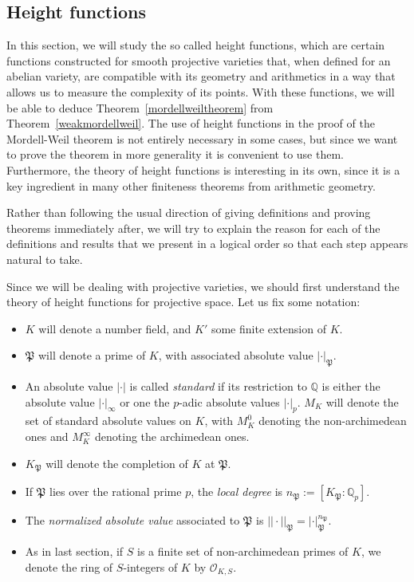 \documentclass[a4paper, 12pt]{amsart}
\theoremstyle{definition}
\theoremstyle{plain}
\theoremstyle{plain}
\theoremstyle{plain}
\theoremstyle{plain}
\theoremstyle{remark}
\theoremstyle{remark}
\theoremstyle{plain}
\newcommand{\thmref}[1]{Theorem~\ref{#1}}
\newcommand{\Q}{\mathbb{Q}}
\renewcommand{\P}{\mathfrak{P}}
\begin{document}
	\subsection{Height functions}
	
	In this section, we will study the so called height functions, which are certain functions constructed for smooth projective varieties that, when defined for an abelian variety, are compatible with its geometry and arithmetics in a way that allows us to measure the complexity of its points. With these functions, we will be able to deduce \thmref{mordellweiltheorem} from \thmref{weakmordellweil}. The use of height functions in the proof of the Mordell-Weil theorem is not entirely necessary in some cases, but since we want to prove the theorem in more generality it is convenient to use them. Furthermore, the theory of height functions is interesting in its own, since it is a key ingredient in many other finiteness theorems from arithmetic geometry.
	
	Rather than following the usual direction of giving definitions and proving theorems immediately after, we will try to explain the reason for each of the definitions and results that we present in a logical order so that each step appears natural to take.
	
	Since we will be dealing with projective varieties, we should first understand the theory of height functions for projective space. Let us fix some notation:
	\begin{itemize}
		\item $K$ will denote a number field, and $K'$ some finite extension of $K$.
		\item $\P$ will denote a prime of $K$, with associated absolute value $|\cdot|_\P$.
		\item An absolute value $|\cdot|$ is called \emph{standard} if its restriction to $\Q$ is either the absolute value $|\cdot|_\infty$ or one the $p$-adic absolute values $|\cdot|_p$. $M_K$ will denote the set of standard absolute values on $K$, with $M_K^0$ denoting the non-archimedean ones and $M_K^\infty$ denoting the archimedean ones. 
		\item $K_\P$ will denote the completion of $K$ at $\P$.
		\item If $\P$ lies over the rational prime $p$, the \emph{local degree} is $n_\P:=[K_\P:\Q_p]$.
		\item The \emph{normalized absolute value} associated to $\P$ is $||\cdot||_\P=|\cdot|_\P^{n_\P}$.
		\item As in last section, if $S$ is a finite set of non-archimedean primes of $K$, we denote the ring of $S$-integers of $K$ by $\mathcal{O}_{K,S}$.
	\end{itemize}
	
\end{document}
